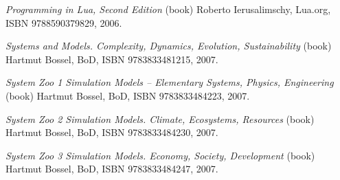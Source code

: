 \item
{\it Programming in Lua, Second Edition} (book)\crlf
Roberto Ierusalimschy, Lua.org, ISBN 9788590379829, 2006.

\item
{\it Systems and Models. Complexity, Dynamics, Evolution, Sustainability} (book)\crlf
Hartmut Bossel, BoD, ISBN 9783833481215, 2007.

\item
{\it System Zoo 1 Simulation Models -- Elementary Systems, Physics, Engineering} (book)\crlf
Hartmut Bossel, BoD, ISBN 9783833484223, 2007.

\item
{\it System Zoo 2 Simulation Models. Climate, Ecosystems, Resources} (book)\crlf
Hartmut Bossel, BoD, ISBN 9783833484230, 2007.

\item
{\it System Zoo 3 Simulation Models. Economy, Society, Development} (book)\crlf
Hartmut Bossel, BoD, ISBN 9783833484247, 2007.
\stopitemize

